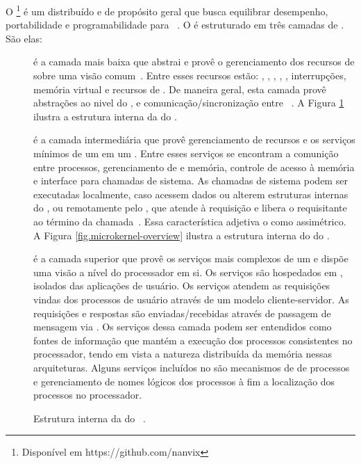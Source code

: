 O \nanvix\footnote{Disponível em https://github.com/nanvix} é um \os distribuído e de propósito geral que busca equilibrar desempenho, portabilidade e programabilidade para \lws~\cite{penna:sbesc19}. O \nanvix é estruturado em três camadas de . São elas:
\begin{description}
    \item [\nanvix \hal]
         é a camada mais baixa que abstrai e provê o gerenciamento dos recursos de \hardware sobre uma visão comum~\cite{penna:hal}. Entre esses recursos estão: \cores, \tlbs, \cache, \mmu, \noc, interrupções, memória virtual e recursos de \io. De maneira geral, esta camada provê abstrações ao nivel do \core, \cluster e comunicação/sincronização entre \clusters~\cite{penna:thesis}. A Figura \ref{fig.hal-overview} ilustra a estrutura interna da \hal do \nanvix.
    \item [\nanvix \Microkernel]
        é a camada intermediária que provê gerenciamento de recursos e os serviços mínimos de um \os em um \cluster. Entre esses serviços se encontram a comunição entre processos, gerenciamento de \threads e memória, controle de acesso à memória e interface para chamadas de sistema. As chamadas de sistema podem ser executadas localmente, caso acessem dados \rdo ou alterem estruturas internas do \core, ou remotamente pelo \mcore, que atende à requisição e libera o \score requisitante ao término da chamada~\cite{penna:thesis}. Essa característica adjetiva o \microkernel como assimétrico. A Figura \ref{fig.microkernel-overview} ilustra a estrutura interna do \microkernel do \nanvix.
    \item [\nanvix \Multikernel]
        é a camada superior que provê os serviços mais complexos de um \os e dispõe uma visão a nível do processador em si. Os serviços são hospedados em \clusters, \ie isolados das aplicações de usuário. Os serviços atendem as requisições vindas dos processos de usuário através de um modelo cliente-servidor. As requisições e respostas são enviadas/recebidas através de passagem de mensagem via \noc. Os serviços dessa camada podem ser entendidos como fontes de informação que mantém a execução dos processos consistentes no processador, tendo em vista a natureza distribuída da memória nessas arquiteturas. Alguns serviços incluídos no \nanvix são mecanismos de \spawn de processos e gerenciamento de nomes lógicos dos processos à fim a localização dos processos no processador.
\end{description}

\begin{figure}[t]
    \centering
    
    \caption{Estrutura interna da \hal do \nanvix~\cite{penna:thesis}.}
    \label{fig.hal-overview}
\end{figure}

